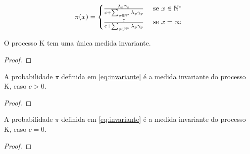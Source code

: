 \begin{equation}
  \label{eq:invariante}
  \pi(x) = \begin{cases}
    \frac{\lambda_x \gamma_x}{c + \sum_{y \in {\mathbb{N^*}}} \lambda_y \gamma_y}
    & \textrm{ se } x \in {\mathbb{N^*}} \\
    \frac{c}{c + \sum_{y \in {\mathbb{N^*}}} \lambda_y \gamma_y}
    & \textrm{ se } x = \infty \\
  \end{cases}
\end{equation}

\begin{proposicao}
  O processo K tem uma única medida invariante.
\end{proposicao}
\begin{proof}
  
\end{proof}


\begin{proposicao}
  A probabilidade $\pi$ definida em \ref{eq:invariante} é a medida
  invariante do processo K, caso $c > 0$.
\end{proposicao}
\begin{proof}
  
\end{proof}

\begin{proposicao}
  A probabilidade $\pi$ definida em \ref{eq:invariante} é a medida
  invariante do processo K, caso $c = 0$.
\end{proposicao}
\begin{proof}
  
\end{proof}


